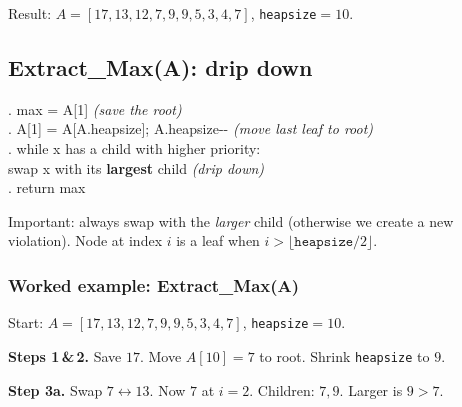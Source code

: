 \documentclass[11pt]{article}
\newcommand{\heapcoords}{\foreach \hi/\hx/\hy in {1/0/4.5,2/-2.3/3.0,3/2.3/3.0,4/-3.45/1.6,5/-1.15/1.6,6/1.15/1.6,7/3.45/1.6,8/-4.0/0.2,9/-2.9/0.2,10/-1.75/0.2}{\coordinate (p\hi) at (\hx,\hy);}}
\newcommand{\drawheap}[2]{%
  \heapcoords
  \begin{scope}[on background layer]\foreach \a/\b in {#2}{\draw[hedge] (p\a)--(p\b);}\end{scope}
  \foreach \idx/\val/\col in {#1}{%
     \node[hnode,text=\col] (n\idx) at (p\idx) {\val};
     \node[hidx] at ([shift={(-0.30,0.30)}]p\idx) {\idx};}
}
\begin{document}
Result: $A = [17,13,12,7,9,9,5,3,4,7]$, \texttt{heapsize}$=10$.

\subsection{Extract\_Max(A): drip down}

\begin{codebox}
. max = A[1] \hfill\textnormal{\itshape (save the root)}\\[3pt]
. A[1] = A[A.heapsize]; A.heapsize{-}{-} \hfill\textnormal{\itshape (move last leaf to root)}\\[3pt]
. while x has a child with higher priority:\\
\ttfamily \hspace*{2em}swap x with its \textbf{largest} child \hfill\textnormal{\itshape (drip down)}\\[3pt]
. return max
\end{codebox}

Important: always swap with the \emph{larger} child (otherwise we create a new violation). Node at index $i$ is a leaf when $i > \lfloor \texttt{heapsize}/2 \rfloor$.

\subsubsection*{Worked example: Extract\_Max(A)}
Start: $A = [17,13,12,7,9,9,5,3,4,7]$, \texttt{heapsize}$=10$.

\textbf{Steps 1\,\&\,2.} Save $17$. Move $A[10]=7$ to root. Shrink \texttt{heapsize} to $9$.

\begin{center}
\end{center}

\textbf{Step 3a.} Swap $7 \leftrightarrow 13$. Now $7$ at $i=2$. Children: $7, 9$. Larger is $9 > 7$.

\begin{center}
\end{center}
\end{document}
